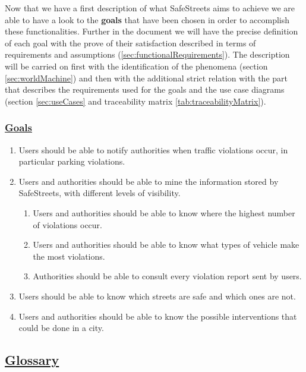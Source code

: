 	 Now that we have a first description of what SafeStreets aims to achieve we are able to have a look to the \textbf{goals} that have been chosen in order to accomplish these functionalities. Further in the document we will have the precise definition of each goal with the prove of their satisfaction described in terms of requirements and assumptions (\ref{sec:functionalRequirements}). The description will be carried on first with the identification of the phenomena (section \ref{sec:worldMachine}) and then with the additional strict relation with the part that describes the requirements used for the goals and the use case diagrams (section \ref{sec:useCases} and traceability matrix \ref{tab:traceabilityMatrix}). 
	
	\subsubsection[Goals]{\hyperlink{toc}{Goals}}
		\label{sec:goals}
		\begin{enumerate}[label=\textbf{G\arabic*}]
			\item \label{goal:notification} Users should be able to notify authorities when traffic violations occur, in particular parking violations.
			\item \label{goal:mining} Users and authorities should be able to mine the information stored by SafeStreets, with different levels of visibility.
				\begin{enumerate}[label=\textbf{G2\Alph*}]
					\item \label{goal:miningA} Users and authorities should be able to know where the highest number of violations occur.
					\item \label{goal:miningB} Users and authorities should be able to know what types of vehicle make the most violations.
					\item \label{goal:miningC} Authorities should be able to consult every violation report sent by users.
				\end{enumerate}
			\item \label{goal:safety} Users should be able to know which streets are safe and which ones are not.
			\item \label{goal:intervention} Users and authorities should be able to know the possible interventions that could be done in a city.
		\end{enumerate}
	
\subsection[Glossary]{\hyperlink{toc}{Glossary}}
	\label{sec:glossary}
